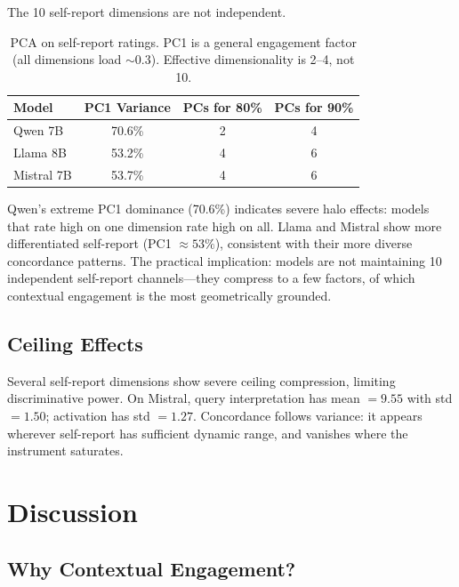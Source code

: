 \documentclass[11pt,a4paper]{article}
\begin{document}
The 10 self-report dimensions are not independent.

\begin{table}[H]
\centering
\caption{PCA on self-report ratings. PC1 is a general engagement factor (all dimensions load $\sim$0.3). Effective dimensionality is 2--4, not 10.}
\label{tab:pca}
\begin{tabular}{lccc}
\toprule
\textbf{Model} & \textbf{PC1 Variance} & \textbf{PCs for 80\%} & \textbf{PCs for 90\%} \\
\midrule
Qwen 7B    & 70.6\% & 2 & 4 \\
Llama 8B   & 53.2\% & 4 & 6 \\
Mistral 7B & 53.7\% & 4 & 6 \\
\bottomrule
\end{tabular}
\end{table}

Qwen's extreme PC1 dominance (70.6\%) indicates severe halo effects: models that rate high on one dimension rate high on all. Llama and Mistral show more differentiated self-report (PC1 $\approx 53\%$), consistent with their more diverse concordance patterns. The practical implication: models are not maintaining 10 independent self-report channels---they compress to a few factors, of which contextual engagement is the most geometrically grounded.

\subsection{Ceiling Effects}

Several self-report dimensions show severe ceiling compression, limiting discriminative power. On Mistral, query interpretation has mean $= 9.55$ with std $= 1.50$; activation has std $= 1.27$. Concordance follows variance: it appears wherever self-report has sufficient dynamic range, and vanishes where the instrument saturates.

\section{Discussion}

\subsection{Why Contextual Engagement?}
\end{document}
